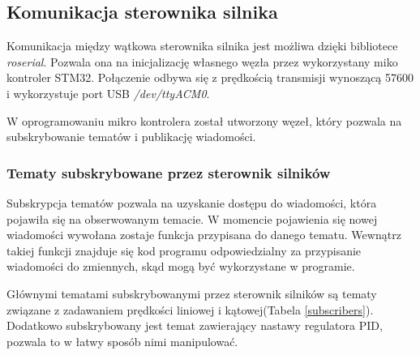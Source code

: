 \subsection{Komunikacja sterownika silnika}

Komunikacja między wątkowa sterownika silnika jest możliwa dzięki bibliotece \textit{roserial}. Pozwala ona na inicjalizację własnego węzła przez wykorzystany miko kontroler STM32. Połączenie odbywa się  z prędkością transmisji wynoszącą 57600 i wykorzystuje port USB \textit{/dev/ttyACM0}.

W oprogramowaniu mikro kontrolera został utworzony węzeł, który pozwala na subskrybowanie tematów i publikację wiadomości.
\subsubsection{Tematy subskrybowane przez sterownik silników}

Subskrypcja tematów pozwala na uzyskanie dostępu do wiadomości, która pojawiła się na obserwowanym temacie. W momencie pojawienia się nowej wiadomości wywołana zostaje funkcja przypisana do danego tematu. Wewnątrz takiej funkcji znajduje się kod programu odpowiedzialny za  przypisanie wiadomości do zmiennych, skąd mogą być wykorzystane w programie. 

Głównymi tematami subskrybowanymi przez sterownik silników są tematy związane z zadawaniem prędkości liniowej i kątowej(Tabela \ref{subscribers}). Dodatkowo subskrybowany jest temat zawierający nastawy regulatora PID, pozwala to w łatwy sposób nimi manipulować.  

\begin{table}[h]
	\centering
	\caption{Tematy subskrybowane przez sterownik silników..}
	\label{subscribers}
\end{table}




